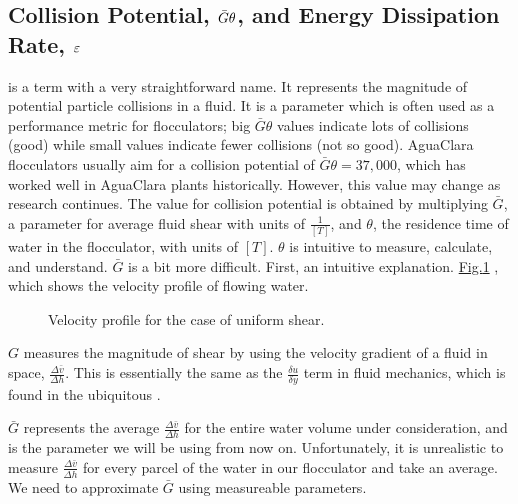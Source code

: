\documentclass[letterpaper,10pt,english]{sphinxmanual}
\let\sphinxpxdimen\pdfpxdimen\else\newdimen\sphinxpxdimen
\begin{document}
\subsection{Collision Potential, \protect\(\bar G \theta\protect\), and Energy Dissipation Rate, \protect\(\varepsilon\protect\)}
\label{\detokenize{Flocculation/Floc_Design:collision-potential-and-energy-dissipation-rate}}
 is a term with a very straightforward name. It represents the magnitude of potential particle collisions in a fluid. It is a  parameter which is often used as a performance metric for flocculators; big \(\bar G \theta\) values indicate lots of collisions (good) while small values indicate fewer collisions (not so good). AguaClara flocculators usually aim for a collision potential of \(\bar G \theta = 37,000\), which has worked well in AguaClara plants historically. However, this value may change as research continues. The value for collision potential is obtained by multiplying \(\bar G\), a parameter for average fluid shear with units of \(\frac{1}{[T]}\), and \(\theta\), the residence time of water in the flocculator, with units of \([T]\). \(\theta\) is intuitive to measure, calculate, and understand. \(\bar G\) is a bit more difficult. First, an intuitive explanation. \hyperref[\detokenize{Flocculation/Floc_Design:figure-g-velocity-profile}]{Fig.\@ \ref{\detokenize{Flocculation/Floc_Design:figure-g-velocity-profile}}} , which shows the velocity profile of flowing water.

\begin{figure}[htbp]
\centering
\capstart

\noindent\sphinxincludegraphics[width=300\sphinxpxdimen]{{G_velocity_profile}.jpg}
\caption{Velocity profile for the case of uniform shear.}\label{\detokenize{Flocculation/Floc_Design:id2}}\label{\detokenize{Flocculation/Floc_Design:figure-g-velocity-profile}}\end{figure}

\(G\) measures the magnitude of shear by using the velocity gradient of a fluid in space, \(\frac{\Delta \bar v}{\Delta h}\). This is essentially the same as the \(\frac{\delta u}{\delta y}\) term in fluid mechanics, which is found in the ubiquitous .

\(\bar G\) represents the average \(\frac{\Delta \bar v}{\Delta h}\) for the entire water volume under consideration, and is the parameter we will be using from now on. Unfortunately, it is unrealistic to measure \(\frac{\Delta \bar v}{\Delta h}\) for every parcel of the water in our flocculator and take an average. We need to approximate \(\bar G\) using measureable parameters.
\end{document}
